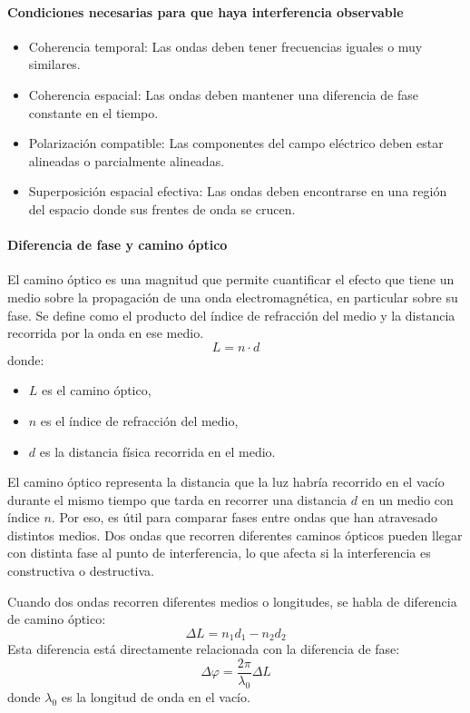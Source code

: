 \paragraph{Condiciones necesarias para que haya interferencia observable}
\begin{itemize}
  \item Coherencia temporal: Las ondas deben tener frecuencias iguales o muy similares.
  \item Coherencia espacial: Las ondas deben mantener una diferencia de fase constante en el tiempo.
  \item Polarización compatible: Las componentes del campo eléctrico deben estar alineadas o parcialmente alineadas.
  \item Superposición espacial efectiva: Las ondas deben encontrarse en una región del espacio donde sus frentes de onda se crucen.
\end{itemize}

\paragraph{Diferencia de fase y camino óptico}

El camino óptico es una magnitud que permite cuantificar el efecto que tiene un medio sobre la propagación de una onda electromagnética, en particular sobre su fase. Se define como el producto del índice de refracción del medio y la distancia recorrida por la onda en ese medio.
\[
L = n \cdot d
\]
donde:
\begin{itemize}
  \item $L$ es el camino óptico,
  \item $n$ es el índice de refracción del medio,
  \item $d$ es la distancia física recorrida en el medio.
\end{itemize}
El camino óptico representa la distancia que la luz habría recorrido en el vacío durante el mismo tiempo que tarda en recorrer una distancia \(d\) en un medio con índice \(n\). Por eso, es útil para comparar fases entre ondas que han atravesado distintos medios. Dos ondas que recorren diferentes caminos ópticos pueden llegar con distinta fase al punto de interferencia, lo que afecta si la interferencia es constructiva o destructiva.

Cuando dos ondas recorren diferentes medios o longitudes, se habla de diferencia de camino óptico:
\[
\Delta L = n_1 d_1 - n_2 d_2
\]
Esta diferencia está directamente relacionada con la diferencia de fase:
\[
\Delta \varphi = \frac{2\pi}{\lambda_0} \Delta L
\]
donde \(\lambda_0\) es la longitud de onda en el vacío.

